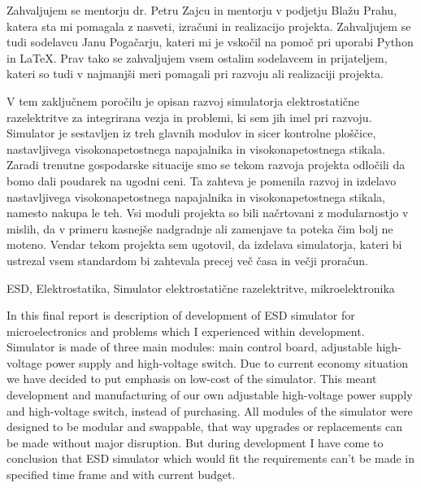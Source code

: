 \documentclass[a4paper,twoside,openright,12pt,Slovene]{book}
\date{Ljubljana, \the\year}
\begin{document}
\frontmatter


\maketitle

\zahvala
Zahvaljujem se mentorju dr. Petru Zajcu in mentorju v podjetju Blažu Prahu, katera sta mi pomagala z nasveti, izračuni in realizacijo projekta. Zahvaljujem se tudi sodelavcu Janu Pogačarju, kateri mi je vskočil na pomoč pri uporabi Python in LaTeX. Prav tako se zahvaljujem vsem ostalim sodelavcem in prijateljem, kateri so tudi v najmanjši meri pomagali pri razvoju ali realizaciji projekta.


\povzetek
V tem zaključnem poročilu je opisan razvoj simulatorja elektrostatične razelektritve za integrirana vezja in problemi, ki sem jih imel pri razvoju. Simulator je sestavljen iz treh glavnih modulov in sicer kontrolne ploščice, nastavljivega visokonapetostnega napajalnika in visokonapetostnega stikala.
Zaradi trenutne gospodarske situacije smo se tekom razvoja projekta odločili da bomo dali poudarek na ugodni ceni. Ta zahteva je pomenila razvoj in izdelavo nastavljivega visokonapetostnega napajalnika in visokonapetostnega stikala, namesto nakupa le teh. 
Vsi moduli projekta so bili načrtovani z modularnostjo v mislih, da v primeru kasnejše nadgradnje ali zamenjave ta poteka čim bolj ne moteno. Vendar tekom projekta sem ugotovil, da izdelava simulatorja, kateri bi ustrezal vsem standardom bi zahtevala precej več časa in večji proračun.

\kljucnebesede
ESD, Elektrostatika, Simulator elektrostatične razelektritve, mikroelektronika



\abstract
In this final report is description of development of ESD simulator for microelectronics and problems which I experienced within development. Simulator is made of three main modules: main control board, adjustable high-voltage power supply and high-voltage switch. Due to current economy situation we have decided to put emphasis on low-cost of the simulator. This meant development and manufacturing of our own adjustable high-voltage power supply and high-voltage switch, instead of purchasing. All modules of the simulator were designed to be modular and swappable, that way upgrades or replacements can be made without major disruption. But during development I have come to conclusion that ESD simulator which would fit the requirements can't be made in specified time frame and with current budget.
\end{document}
